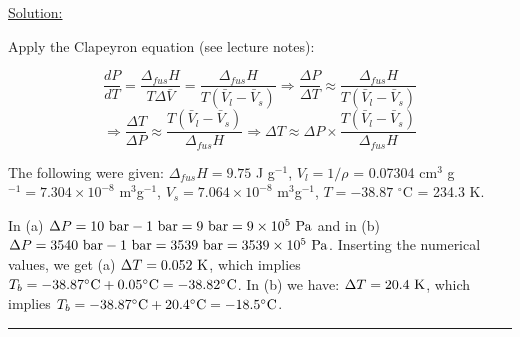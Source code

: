 \noindent
\underline{Solution:}

Apply the Clapeyron equation (see lecture notes):

$$\frac{dP}{dT} = \frac{\Delta_{fus}H}{T\Delta\bar{V}} = \frac{\Delta_{fus}H}{T\left(\bar{V}_l - \bar{V}_s\right)} \Rightarrow \frac{\Delta P}{\Delta T} \approx \frac{\Delta_{fus}H}{T\left(\bar{V}_l - \bar{V}_s\right)}$$
$$\Rightarrow \frac{\Delta T}{\Delta P} \approx \frac{T\left(\bar{V}_l - \bar{V}_s\right)}{\Delta_{fus}H} \Rightarrow \Delta T \approx \Delta P\times \frac{T\left(\bar{V}_l - \bar{V}_s\right)}{\Delta_{fus}H}$$

The following were given: $\Delta_{fus}H = 9.75$ J g$^{-1}$, $V_l = 1 / \rho$ = 0.07304 cm$^3$ g$^{-1} = 7.304\times 10^{-8}$ m$^3$g$^{-1}$, $V_s = 7.064\times 10^{-8}$ m$^3$g$^{-1}$, $T = -38.87$ $^\circ$C = 234.3 K.

In (a) $\Delta P = 10\textnormal{ bar} - 1\textnormal{ bar} = 9\textnormal{ bar} = 9\times 10^5\textnormal{ Pa}$ and in (b) $\Delta P = 3540\textnormal{ bar} - 1\textnormal{ bar} = 3539\textnormal{ bar} = 3539\times 10^5\textnormal{ Pa}$. Inserting the numerical values, we get (a) $\Delta T = 0.052\textnormal{ K}$, which implies $T_b = -38.87^\circ\textnormal{C} + 0.05^\circ\textnormal{C} = -38.82^\circ\textnormal{C}$. In (b) we have: $\Delta T = 20.4\textnormal{ K}$, which implies $T_b = -38.87^\circ\textnormal{C} + 20.4^\circ\textnormal{C} = -18.5^\circ\textnormal{C}$.

\hrule\vspace{0.5cm}
